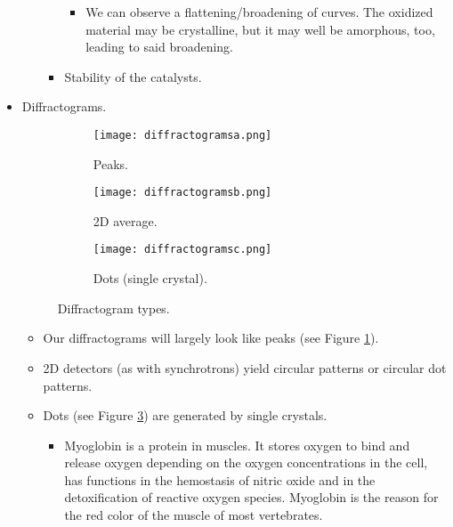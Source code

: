 \documentclass[../notes.tex]{subfiles}
\begin{document}
\begin{itemize}
\begin{itemize}
\begin{itemize}
\begin{itemize}
                \item We can observe a flattening/broadening of curves. The oxidized material may be crystalline, but it may well be amorphous, too, leading to said broadening.
            \end{itemize}
            \item Stability of the catalysts.
        \end{itemize}
    \end{itemize}
    \item Diffractograms.
    \begin{figure}[H]
        \centering
        \begin{subfigure}[b]{0.33\linewidth}
            \centering
            \texttt{[image: diffractogramsa.png]}
            \caption{Peaks.}
            \label{fig:diffractogramsa}
        \end{subfigure}
        \begin{subfigure}[b]{0.32\linewidth}
            \centering
            \texttt{[image: diffractogramsb.png]}
            \caption{2D average.}
            \label{fig:diffractogramsb}
        \end{subfigure}
        \begin{subfigure}[b]{0.33\linewidth}
            \centering
            \texttt{[image: diffractogramsc.png]}
            \caption{Dots (single crystal).}
            \label{fig:diffractogramsc}
        \end{subfigure}
        \caption{Diffractogram types.}
        \label{fig:diffractograms}
    \end{figure}
    \begin{itemize}
        \item Our diffractograms will largely look like peaks (see Figure \ref{fig:diffractogramsa}).
        \item 2D detectors (as with synchrotrons) yield circular patterns or circular dot patterns.
        \item Dots (see Figure \ref{fig:diffractogramsc}) are generated by single crystals.
        \begin{itemize}
            \item Myoglobin is a protein in muscles. It stores oxygen to bind and release oxygen depending on the oxygen concentrations in the cell, has functions in the hemostasis of nitric oxide and in the detoxification of reactive oxygen species. Myoglobin is the reason for the red color of the muscle of most vertebrates.

\end{itemize}
\end{itemize}
\end{itemize}
\end{document}
